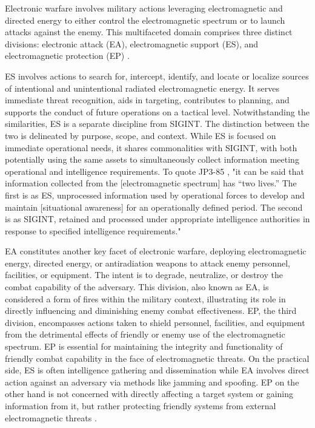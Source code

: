 \documentclass[english, 12pt, a4paper, elec, utf8, a-1b, online]{aaltothesis}
\begin{document}
Electronic warfare involves military actions leveraging electromagnetic and directed energy to either control the electromagnetic spectrum or to launch attacks against the enemy. This multifaceted domain comprises three distinct divisions: electronic attack (EA), electromagnetic support (ES), and electromagnetic protection (EP) \cite{jp3-85,kosola2013digitaalinen}.

ES involves actions to search for, intercept, identify, and locate or localize sources of intentional and unintentional radiated electromagnetic energy. It serves immediate threat recognition, aids in targeting, contributes to planning, and supports the conduct of future operations on a tactical level. Notwithstanding the similarities, ES is a separate discipline from SIGINT. The distinction between the two is delineated by purpose, scope, and context. While ES is focused on immediate operational needs, it shares commonalities with SIGINT, with both potentially using the same assets to simultaneously collect information meeting operational and intelligence requirements.
To quote JP3-85 \cite{jp3-85}, "it can be said that information collected from the [electromagnetic spectrum] has “two lives.”
The first is as ES, unprocessed information used by operational forces to develop and maintain [situational awareness] for an operationally defined period.
The second is as SIGINT, retained and processed under appropriate intelligence authorities in response to specified intelligence requirements."

EA constitutes another key facet of electronic warfare, deploying electromagnetic energy, directed energy, or antiradiation weapons to attack enemy personnel, facilities, or equipment. The intent is to degrade, neutralize, or destroy the combat capability of the adversary.
This division, also known as EA, is considered a form of fires within the military context, illustrating its role in directly influencing and diminishing enemy combat effectiveness.
EP, the third division, encompasses actions taken to shield personnel, facilities, and equipment from the detrimental effects of friendly or enemy use of the electromagnetic spectrum. EP is essential for maintaining the integrity and functionality of friendly combat capability in the face of electromagnetic threats.
On the practical side, ES is often intelligence gathering and dissemination while EA involves direct action against an adversary via methods like jamming and spoofing.
EP on the other hand is not concerned with directly affecting a target system or gaining information from it, but rather protecting friendly systems from external electromagnetic threats \cite{kosola2013digitaalinen,jp3-85}.
\end{document}

